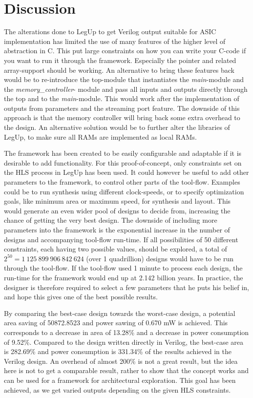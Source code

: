 \chapter{Discussion}

The alterations done to LegUp to get Verilog output suitable for ASIC implementation has limited the use of many features of the higher level of abstraction in C. This put large constraints on how you can write your C-code if you want to run it through the framework. Especially the pointer and related array-support should be working. An alternative to bring these features back would be to re-introduce the top-module that instantiates the \textit{main}-module and the \textit{memory\_controller}- module and pass all inputs and outputs directly through the top and to the \textit{main}-module. This would work after the implementation of outputs from parameters and the streaming port feature. The downside of this approach is that the memory controller will bring back some extra overhead to the design. An alternative solution would be to further alter the libraries of LegUp, to make sure all RAMs are implemented as local RAMs. 

The framework has been created to be easily configurable and adaptable if it is desirable to add functionality. For this proof-of-concept, only constraints set on the HLS process in LegUp has been used. It could however be useful to add other parameters to the framework, to control other parts of the tool-flow. Examples could be to run synthesis using different clock-speeds, or to specify optimization goals, like minimum area or maximum speed, for synthesis and layout. This would generate an even wider pool of designs to decide from, increasing the chance of getting the very best design. The downside of including more parameters into the framework is the exponential increase in the number of designs and accompanying tool-flow run-time. If all possibilities of 50 different constraints, each having two possible values, should be explored, a total of $2^{50} = 1~125~899~906~842~624$ (over 1 quadrillion) designs would have to be run through the tool-flow. If the tool-flow used 1 minute to process each design, the run-time for the framework would end up at 2.142 billion years. In practice, the designer is therefore required to select a few parameters that he puts his belief in, and hope this gives one of the best possible results.

By comparing the best-case design towards the worst-case design, a potential area saving of 50872.8523 and power sawing of 0.670 mW is achieved. This corresponds to a decrease in area of 13.28\% and a decrease in power consumption of 9.52\%. Compared to the design written directly in Verilog, the best-case area is 282.69\% and power consumption is 331.34\% of the results achieved in the Verilog design. An overhead of almost 200\% is not a great result, but the idea here is not to get a comparable result, rather to show that the concept works and can be used for a framework for architectural exploration. This goal has been achieved, as we get varied outputs depending on the given HLS constraints.

